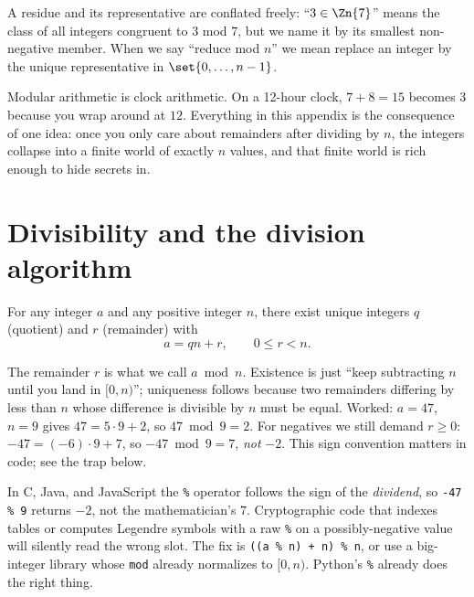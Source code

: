 A residue and its representative are conflated freely: ``$3 \in \Zn{7}$'' means the class of all
integers congruent to $3$ mod $7$, but we name it by its smallest non-negative member. When we say
``reduce mod $n$'' we mean replace an integer by the unique representative in $\set{0,\dots,n-1}$.

\begin{intuitionbox}
Modular arithmetic is clock arithmetic. On a 12-hour clock, $7 + 8 = 15$ becomes $3$ because you
wrap around at $12$. Everything in this appendix is the consequence of one idea: once you only care
about remainders after dividing by $n$, the integers collapse into a finite world of exactly $n$
values, and that finite world is rich enough to hide secrets in.
\end{intuitionbox}

\section{Divisibility and the division algorithm}
\label{ch40:division}

\begin{theorem}
\label{ch40:thm-division}
For any integer $a$ and any positive integer $n$, there exist unique integers $q$ (quotient) and
$r$ (remainder) with
\[
  a = qn + r, \qquad 0 \le r < n.
\]
\end{theorem}

The remainder $r$ is what we call $a \bmod n$. Existence is just ``keep subtracting $n$ until you
land in $[0,n)$''; uniqueness follows because two remainders differing by less than $n$ whose
difference is divisible by $n$ must be equal. Worked: $a = 47$, $n = 9$ gives $47 = 5\cdot 9 + 2$, so
$47 \bmod 9 = 2$. For negatives we still demand $r \ge 0$: $-47 = (-6)\cdot 9 + 7$, so
$-47 \bmod 9 = 7$, \emph{not} $-2$. This sign convention matters in code; see the trap below.

\begin{trapbox}
In C, Java, and JavaScript the \texttt{\%} operator follows the sign of the \emph{dividend}, so
\texttt{-47 \% 9} returns $-2$, not the mathematician's $7$. Cryptographic code that indexes tables
or computes Legendre symbols with a raw \texttt{\%} on a possibly-negative value will silently read
the wrong slot. The fix is \texttt{((a \% n) + n) \% n}, or use a big-integer library whose
\texttt{mod} already normalizes to $[0,n)$. Python's \texttt{\%} already does the right thing.
\end{trapbox}

